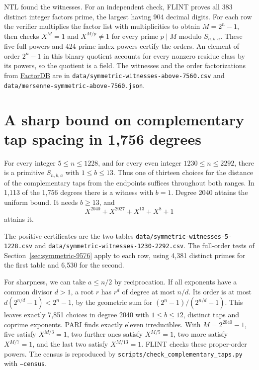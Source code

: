 \documentclass[11pt]{article}
\begin{document}
NTL found the witnesses. For an independent check, FLINT proves all
383 distinct integer factors prime, the largest having 904 decimal
digits. For each row the verifier multiplies the factor list with
multiplicities to obtain \(M=2^n-1\), then checks \(X^M=1\) and
\(X^{M/p}\ne1\) for every prime \(p\mid M\) modulo \(S_{n,b,a}\).
These five full powers and 424 prime-index powers certify the orders.
An element of order \(2^n-1\) in this binary quotient accounts for
every nonzero residue class by its powers, so the quotient is a field.
The witnesses and the order factorizations from
\href{https://factordb.com/}{FactorDB} are in
\nolinkurl{data/symmetric-witnesses-above-7560.csv} and
\nolinkurl{data/mersenne-symmetric-above-7560.json}.

\section{A sharp bound on complementary tap spacing in 1,756 degrees}
\label{sec:complementary-spacing-range}
For every integer \(5\le n\le1228\), and for every even integer
\(1230\le n\le2292\), there is a primitive \(S_{n,b,a}\) with
\(1\le b\le13\). Thus one of thirteen choices for the distance of the
complementary taps from the endpoints suffices throughout both ranges.
In 1,113 of the 1,756 degrees there is a witness with \(b=1\).
Degree 2040 attains the uniform bound. It needs \(b\ge13\), and
\[
                  X^{2040}+X^{2027}+X^{13}+X^8+1
\]
attains it.

The positive certificates are the two tables
\nolinkurl{data/symmetric-witnesses-5-1228.csv} and
\nolinkurl{data/symmetric-witnesses-1230-2292.csv}.
The full-order tests of Section~\ref{sec:symmetric-9576} apply to
each row, using 4,381 distinct primes for the first table and 6,530
for the second.

For sharpness, we can take \(a\le n/2\) by reciprocation. If all
exponents have a common divisor \(d>1\), a root \(r\) has \(r^d\)
of degree at most \(n/d\). Its order is at most
\(d(2^{n/d}-1)<2^n-1\), by the geometric sum for
\((2^n-1)/(2^{n/d}-1)\). This leaves exactly 7,851 choices in degree
2040 with \(1\le b\le12\), distinct taps and coprime exponents.
PARI finds exactly eleven irreducibles. With \(M=2^{2040}-1\),
five satisfy \(X^{M/3}=1\), two further ones satisfy \(X^{M/5}=1\),
two more satisfy \(X^{M/7}=1\), and the last two satisfy \(X^{M/13}=1\).
FLINT checks these proper-order powers. The census is reproduced by
\nolinkurl{scripts/check_complementary_taps.py} with \texttt{--census}.
\end{document}
